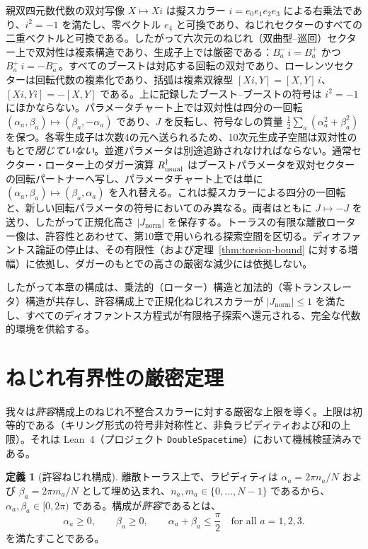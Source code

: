 \documentclass[a4paper]{article}
\theoremstyle{definition}
\newtheorem{definition}[theorem]{定義}
\theoremstyle{remark}
\newcommand{\Jnorm}{J_{\mathrm{norm}}}
\begin{document}
親双四元数代数の双対写像 \( X \mapsto Xi \) は擬スカラー \( i=e_0e_1e_2e_3 \) による右乗法であり、\( i^2=-1 \) を満たし、零ベクトル \( e_4 \) と可換であり、ねじれセクターのすべての二重ベクトルと可換である。したがって六次元のねじれ（双曲型--巡回）セクター上で双対性は複素構造であり、生成子上では厳密である：\( B^-_a\,i = B^+_a \) かつ \( B^+_a\,i=-B^-_a \)。すべてのブーストは対応する回転の双対であり、ローレンツセクターは回転代数の複素化であり、括弧は複素双線型 \([Xi,Y]=[X,Y]\,i\)、\([Xi,Yi]=-[X,Y]\) である。上に記録したブースト--ブーストの符号は \( i^2=-1 \) にほかならない。パラメータチャート上では双対性は四分の一回転 \((\alpha_a,\beta_a)\mapsto(\beta_a,-\alpha_a)\) であり、\(J\) を反転し、符号なしの質量 \(\tfrac12\sum_a(\alpha_a^2+\beta_a^2)\) を保つ。各零生成子は次数4の元へ送られるため、10次元生成子空間は双対性のもとで\emph{閉じていない}。並進パラメータは別途追跡されなければならない。通常セクター・ローター上のダガー演算 \( R_{\rm usual}^\dagger \) はブーストパラメータを双対セクターの回転パートナーへ写し、パラメータチャート上では単に \((\alpha_a,\beta_a)\mapsto(\beta_a,\alpha_a)\) を入れ替える。これは擬スカラーによる四分の一回転と、新しい回転パラメータの符号においてのみ異なる。両者はともに \(J\mapsto -J\) を送り、したがって正規化高さ \(|\Jnorm|\) を保存する。トーラスの有限な離散ローター像は、許容性とあわせて、第10章で用いられる探索空間を区切る。ディオファントス論証の停止は、その有限性（および定理~\ref{thm:torsion-bound} に対する増幅）に依拠し、ダガーのもとでの高さの厳密な減少には依拠しない。

したがって本章の構成は、乗法的（ローター）構造と加法的（零トランスレータ）構造が共存し、許容構成上で正規化ねじれスカラーが \(|\Jnorm|\leq 1\) を満たし、すべてのディオファントス方程式が有限格子探索へ還元される、完全な代数的環境を供給する。

\section{ねじれ有界性の厳密定理}

我々は\emph{許容}構成上のねじれ不整合スカラーに対する厳密な上限を導く。上限は初等的である（キリング形式の符号非対称性と、非負ラピディティおよび和の上限）。それは Lean~4（プロジェクト \texttt{DoubleSpacetime}）において機械検証済みである。

\begin{definition}[許容ねじれ構成]
\label{def:admissible}
離散トーラス上で、ラピディティは \(\alpha_a = 2\pi n_a/N\) および \(\beta_a = 2\pi m_a/N\) として埋め込まれ、\(n_a,m_a \in \{0,\dots,N-1\}\) であるから、\(\alpha_a,\beta_a \in [0,2\pi)\) である。構成が\emph{許容}であるとは、
\[
\alpha_a \geq 0, \qquad \beta_a \geq 0, \qquad \alpha_a + \beta_a \leq \frac{\pi}{2}
\quad \text{for all } a = 1,2,3.
\]
を満たすことである。
\end{definition}
\end{document}
